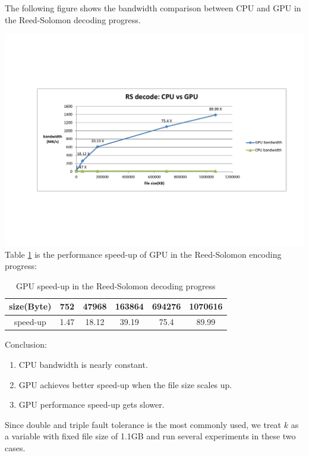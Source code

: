 \documentclass[a4paper]{article}
\begin{document}
The following figure shows the bandwidth comparison between CPU and GPU in the Reed-Solomon decoding progress.

\includegraphics[scale=0.48]{result-graph/decode-CPU-vs-GPU-graph.pdf}
Table \ref{decoding-speed-up} is the performance speed-up of GPU in the Reed-Solomon encoding progress:
\begin{table}
\caption{
GPU speed-up in the Reed-Solomon decoding progress
}
\begin{center}
\begin{tabular}{|c|c|c|c|c|c|}
\hline
size(Byte) & 752  & 47968 & 163864 & 694276 & 1070616 \\
\hline
speed-up   & 1.47 & 18.12 & 39.19  & 75.4   & 89.99 \\
\hline
\end{tabular}
\end{center}
\label{decoding-speed-up}
\end{table}

Conclusion:
\begin{enumerate}
\item CPU bandwidth is nearly constant.
\item GPU achieves better speed-up when the file size scales up.
\item GPU performance speed-up gets slower.
\end{enumerate}


Since double and triple fault tolerance is the most commonly used, we treat $k$ as a variable with fixed file size of 1.1GB and run several experiments in these two cases.
\end{document}
